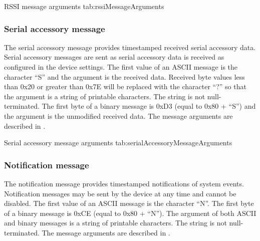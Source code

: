 \begingroup
    \def\tempArgumentA{\acs{RSSI} percentage}
    \def\tempArgumentB{\acs{RSSI} power in dBm}
    \dataMessageTable
    {\acs{RSSI} message arguments}
    {tab:rssiMessageArguments}
\endgroup

\begingroup
    \def\tempNameA{\acs{RSSI} percentage}
    \def\tempNameB{\acs{RSSI} power}
    \def\tempValueA{100}
    \def\tempValueB{-50}
    \def\tempAsciiFirst{W}
    \def\tempAsciiA{100.000}
    \def\tempAsciiB{-50.0000}
    \def\tempBinaryFirst{D7}
    \def\tempBinaryA{00 00 C8 42}
    \def\tempBinaryB{00 00 48 C2}
    \dataMessageExample
\endgroup

\subsubsection{Serial accessory message}

The serial accessory message provides timestamped received serial accessory data.  Serial accessory messages are sent as serial accessory data is received as configured in the device settings.  The first value of an \ac{ASCII} message is the character \enquote{S} and the argument is the received data.  Received byte values less than 0x20 or greater than 0x7E will be replaced with the character \enquote{?} so that the argument is a string of printable characters.  The string is not null-terminated.  The first byte of a binary message is 0xD3 (equal to 0x80 + \enquote{S}) and the argument is the unmodified received data.  The message arguments are described in .

\begingroup
    \def\tempArgumentA{Received serial accessory data}
    \dataMessageTable
    {Serial accessory message arguments}
    {tab:serialAccessoryMessageArguments}
\endgroup

\begingroup
    \def\tempNameA{Data}
    \def\tempValueA{0x61 0x62 0x63 0x31 0x32 0x33 0xF1 0xF2 0xF3}
    \def\tempAsciiFirst{S}
    \def\tempAsciiA{abc123???}
    \def\tempBinaryFirst{D3}
    \def\tempBinaryA{61 62 63 31 32 33 F1 F2 F3}
    \dataMessageExample
\endgroup

\subsubsection{Notification message}

The notification message provides timestamped notifications of system events.  Notification messages may be sent by the device at any time and cannot be disabled.  The first value of an \ac{ASCII} message is the character \enquote{N}.  The first byte of a binary message is 0xCE (equal to 0x80 + \enquote{N}).  The argument of both \ac{ASCII} and binary messages is a string of printable characters.  The string is not null-terminated.  The message arguments are described in .

